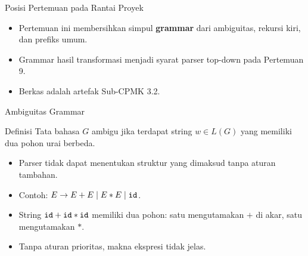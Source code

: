 \documentclass[aspectratio=169,10pt,t]{beamer}
\begin{document}
\begin{frame}{Posisi Pertemuan pada Rantai Proyek}

  \vspace{2pt}
  \begin{itemize}
    \item Pertemuan ini membersihkan simpul \textbf{grammar} dari
          ambiguitas, rekursi kiri, dan prefiks umum.
    \item Grammar hasil transformasi menjadi syarat parser top-down
          pada Pertemuan 9.
    \item Berkas  adalah artefak Sub-CPMK 3.2.
  \end{itemize}
\end{frame}

\begin{frame}{Ambiguitas Grammar}
  \begin{block}{Definisi}
    \small
    Tata bahasa \(G\) ambigu jika terdapat string \(w \in L(G)\) yang
    memiliki dua pohon urai berbeda.
  \end{block}

  \begin{itemize}
    \item Parser tidak dapat menentukan struktur yang dimaksud tanpa
          aturan tambahan.
    \item Contoh: \(E \to E+E \mid E*E \mid \texttt{id}\).
    \item String \(\texttt{id}+\texttt{id}*\texttt{id}\) memiliki dua pohon:
          satu mengutamakan \(+\) di akar, satu mengutamakan \(*\).
    \item Tanpa aturan prioritas, makna ekspresi tidak jelas.
  \end{itemize}
\end{frame}
\end{document}
